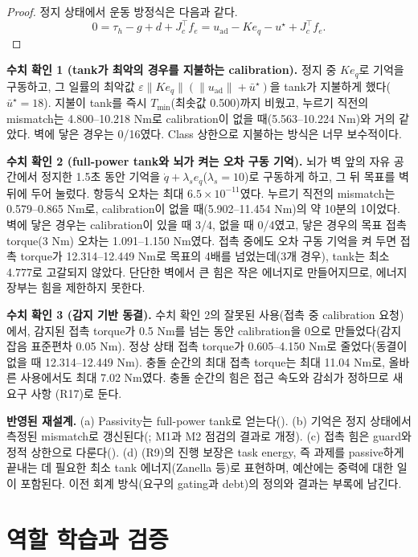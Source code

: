 \documentclass[11pt]{article}\usepackage[margin=1in]{geometry}\usepackage{amsmath,amssymb,amsthm,mathtools}\usepackage{graphicx}\graphicspath{{figures/}{../figures/}{figs/}{./}}\usepackage{enumitem}\usepackage{hyperref}\usepackage{cleveref}\usepackage{tikz}\usetikzlibrary{arrows.meta,positioning,calc,shapes.geometric}\usepackage{float}\usepackage{rotating}\usepackage[most]{tcolorbox}\usepackage{kotex}\usepackage{booktabs}\usepackage{longtable}\emergencystretch=1.6em\tolerance=2000 \crefname{assumption}{Assumption}{Assumptions}\Crefname{assumption}{Assumption}{Assumptions}\crefname{definition}{Definition}{Definitions}\Crefname{definition}{Definition}{Definitions}\crefname{proposition}{Proposition}{Propositions}\Crefname{proposition}{Proposition}{Propositions}\crefname{fact}{Fact}{Facts}\Crefname{fact}{Fact}{Facts} \newtheorem{assumption}{Assumption}\newtheorem{definition}{Definition}\newtheorem{lemma}{Lemma}\newtheorem{proposition}{Proposition}\newtheorem{theorem}{Theorem}\newtheorem{corollary}{Corollary}\newtheorem{fact}{Fact}\theoremstyle{remark}\newtheorem{remark}{Remark} \newcommand{\R}{\mathbb{R}}\newcommand{\xb}{\bar x}\newcommand{\Ab}{\bar A}\newcommand{\By}{\bar B_y}\newcommand{\U}{\mathcal U}\newcommand{\Z}{\mathcal Z}
\begin{document}
\begin{proof}
정지 상태에서 운동 방정식은 다음과 같다.
\[
0=\tau_h-g+d+J_c^\top f_e=u_{\mathrm{ad}}-Ke_q-u^\star+J_c^\top f_e .
\]
\end{proof}

\textbf{수치 확인 1 (tank가 최악의 경우를 지불하는 calibration).} 정지 중 $Ke_q$로 기억을 구동하고, 그 일률의 최악값 $\varepsilon\|Ke_q\|(\|u_{\mathrm{ad}}\|+\bar u^\star)$을 tank가 지불하게 했다($\bar u^\star=18$). 지불이 tank를 즉시 $T_{\min}$(최솟값 0.500)까지 비웠고, 누르기 직전의 mismatch는 4.800--10.218 Nm로 calibration이 없을 때(5.563--10.224 Nm)와 거의 같았다. 벽에 닿은 경우는 0/16였다. Class 상한으로 지불하는 방식은 너무 보수적이다.

\textbf{수치 확인 2 (full-power tank와 뇌가 켜는 오차 구동 기억).} 뇌가 벽 앞의 자유 공간에서 정지한 1.5초 동안 기억을 $\dot q+\lambda_se_q$($\lambda_s=10$)로 구동하게 하고, 그 뒤 목표를 벽 뒤에 두어 눌렀다. 항등식 오차는 최대 $6.5\times10^{-11}$였다. 누르기 직전의 mismatch는 0.579--0.865 Nm로, calibration이 없을 때(5.902--11.454 Nm)의 약 10분의 1이었다. 벽에 닿은 경우는 calibration이 있을 때 3/4, 없을 때 0/4였고, 닿은 경우의 목표 접촉 torque(3 Nm) 오차는 1.091--1.150 Nm였다. 접촉 중에도 오차 구동 기억을 켜 두면 접촉 torque가 12.314--12.449 Nm로 목표의 4배를 넘었는데(3개 경우), tank는 최소 4.777로 고갈되지 않았다. 단단한 벽에서 큰 힘은 작은 에너지로 만들어지므로, 에너지 장부는 힘을 제한하지 못한다.

\textbf{수치 확인 3 (감지 기반 동결).} 수치 확인 2의 잘못된 사용(접촉 중 calibration 요청)에서, 감지된 접촉 torque가 0.5 Nm를 넘는 동안 calibration을 0으로 만들었다(감지 잡음 표준편차 0.05 Nm). 정상 상태 접촉 torque가 0.605--4.150 Nm로 줄었다(동결이 없을 때 12.314--12.449 Nm). 충돌 순간의 최대 접촉 torque는 최대 11.04 Nm로, 올바른 사용에서도 최대 7.02 Nm였다. 충돌 순간의 힘은 접근 속도와 감쇠가 정하므로 새 요구 사항 (R17)로 둔다.

\textbf{반영된 재설계.} (a) Passivity는 full-power tank로 얻는다(). (b) 기억은 정지 상태에서 측정된 mismatch로 갱신된다(; M1과 M2 점검의 결과로 개정). (c) 접촉 힘은 guard와 정적 상한으로 다룬다(). (d) (R9)의 진행 보장은 task energy, 즉 과제를 passive하게 끝내는 데 필요한 최소 tank 에너지(Zanella 등)로 표현하며, 예산에는 중력에 대한 일이 포함된다. 이전 회계 방식(요구의 gating과 debt)의 정의와 결과는 부록에 남긴다.

\section{역할 학습과 검증}
\label{sec:roles}
\end{document}
